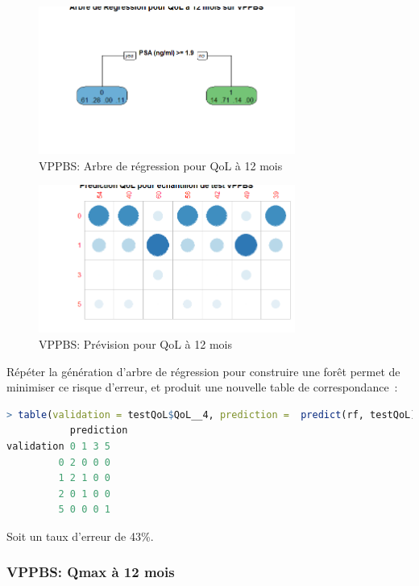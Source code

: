 \begin{figure}[H]
\centering
\includegraphics[width=0.75\textwidth]{../Fig/VPPBS/vppbs-regtree-qol12.png}
\caption{VPPBS: Arbre de régression pour QoL à 12 mois}
\label{fig-vppbs-regtree-qol12}
\end{figure}

\begin{figure}[H]
\centering
\includegraphics[width=0.75\textwidth]{../Fig/VPPBS/vppbs-regtree-predict-qol12.png}
\caption{VPPBS: Prévision pour QoL à 12 mois}
\label{fig-vppbs-regtree-predict-qol12}
\end{figure}

Répéter la génération d'arbre de régression pour construire une forêt permet de
minimiser ce risque d'erreur, et produit une nouvelle table de correspondance~:

\begin{lstlisting}[language=R]
> table(validation = testQoL$QoL__4, prediction =  predict(rf, testQoL))
           prediction
validation 0 1 3 5
         0 2 0 0 0
         1 2 1 0 0
         2 0 1 0 0
         5 0 0 0 1
\end{lstlisting}
Soit un taux d'erreur de 43\%.

\subsubsection{VPPBS: Qmax à 12 mois}

